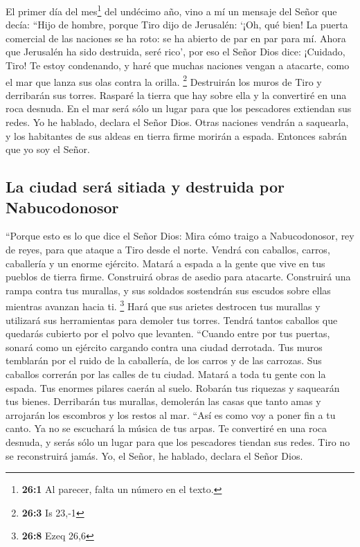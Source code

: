  El primer día del mes\footnote{\textbf{26:1} Al parecer,
  falta un número en el texto.} del undécimo año, vino a mí un mensaje
del Señor que decía:  ``Hijo de hombre, porque Tiro dijo
de Jerusalén: `¡Oh, qué bien! La puerta comercial de las naciones se ha
roto: se ha abierto de par en par para mí. Ahora que Jerusalén ha sido
destruida, seré rico',  por eso el Señor Dios dice:
¡Cuidado, Tiro! Te estoy condenando, y haré que muchas naciones vengan a
atacarte, como el mar que lanza sus olas contra la orilla. \footnote{\textbf{26:3}
  Is 23,-1}  Destruirán los muros de Tiro y derribarán sus
torres. Rasparé la tierra que hay sobre ella y la convertiré en una roca
desnuda.  En el mar será sólo un lugar para que los
pescadores extiendan sus redes. Yo he hablado, declara el Señor Dios.
Otras naciones vendrán a saquearla,  y los habitantes de
sus aldeas en tierra firme morirán a espada. Entonces sabrán que yo soy
el Señor.

\hypertarget{la-ciudad-seruxe1-sitiada-y-destruida-por-nabucodonosor}{%
\subsection{La ciudad será sitiada y destruida por
Nabucodonosor}\label{la-ciudad-seruxe1-sitiada-y-destruida-por-nabucodonosor}}

 ``Porque esto es lo que dice el Señor Dios: Mira cómo
traigo a Nabucodonosor, rey de reyes, para que ataque a Tiro desde el
norte. Vendrá con caballos, carros, caballería y un enorme ejército.
 Matará a espada a la gente que vive en tus pueblos de
tierra firme. Construirá obras de asedio para atacarte. Construirá una
rampa contra tus murallas, y sus soldados sostendrán sus escudos sobre
ellas mientras avanzan hacia ti. \footnote{\textbf{26:8} Ezeq 26,6}
 Hará que sus arietes destrocen tus murallas y utilizará
sus herramientas para demoler tus torres.  Tendrá tantos
caballos que quedarás cubierto por el polvo que levanten. ``Cuando entre
por tus puertas, sonará como un ejército cargando contra una ciudad
derrotada. Tus muros temblarán por el ruido de la caballería, de los
carros y de las carrozas.  Sus caballos correrán por las
calles de tu ciudad. Matará a toda tu gente con la espada. Tus enormes
pilares caerán al suelo.  Robarán tus riquezas y
saquearán tus bienes. Derribarán tus murallas, demolerán las casas que
tanto amas y arrojarán los escombros y los restos al mar.
 ``Así es como voy a poner fin a tu canto. Ya no se
escuchará la música de tus arpas.  Te convertiré en una
roca desnuda, y serás sólo un lugar para que los pescadores tiendan sus
redes. Tiro no se reconstruirá jamás. Yo, el Señor, he hablado, declara
el Señor Dios.

